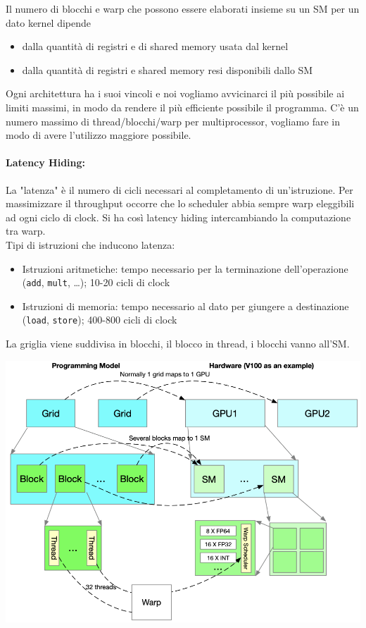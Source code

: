 
Il numero di blocchi e warp che possono essere elaborati insieme su un SM per un dato kernel dipende
\begin{itemize}
	\item dalla quantità di registri e di shared memory usata dal kernel
	\item dalla quantità di registri e shared memory resi disponibili dallo SM
\end{itemize}
Ogni architettura ha i suoi vincoli e noi vogliamo avvicinarci il più possibile ai limiti massimi, in modo da rendere il più efficiente possibile il programma. C'è un numero massimo di thread/blocchi/warp per multiprocessor, vogliamo fare in modo di avere l'utilizzo maggiore possibile.\\

\newpage

\paragraph{Latency Hiding:} La "latenza"  è il numero di cicli necessari al completamento di un'istruzione. Per massimizzare il throughput occorre che lo scheduler abbia sempre warp eleggibili ad ogni ciclo di clock. Si ha così latency hiding intercambiando la computazione tra warp.\\
Tipi di istruzioni che inducono latenza: 
\begin{itemize}
	\item Istruzioni aritmetiche: tempo necessario per la terminazione dell'operazione (\texttt{add}, \texttt{mult}, \dots); 10-20 cicli di clock
	\item Istruzioni di memoria: tempo necessario al dato per giungere a destinazione (\texttt{load}, \texttt{store}); 400-800 cicli di clock
\end{itemize}
La griglia viene suddivisa in blocchi, il blocco in thread, i blocchi vanno all'SM.
\begin{center}
	\includegraphics[width=0.85\linewidth]{img/modelli/modelandhwstruct}
\end{center}

